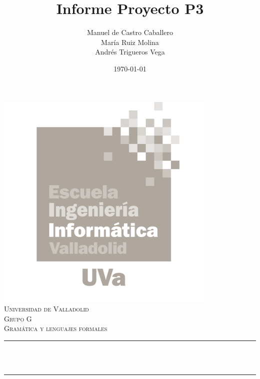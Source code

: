 \documentclass[12pt]{article}
\title{Informe Proyecto P3}					%
\author{Manuel de Castro Caballero \\ María Ruiz Molina \\ Andrés Trigueros Vega}				%
\date{\today}						%
\makeatletter
\let\thetitle\@title
\let\theauthor\@author
\let\thedate\@date
\makeatother
\begin{document}

\begin{titlepage}
	\centering
    \vspace*{0.0 cm}
    \includegraphics[scale = 0.5]{Logo.png}\\[1.0 cm]	%
    \textsc{\LARGE Universidad de Valladolid}\\[2.0 cm]	%
	\textsc{\Large Grupo G}\\[0.5 cm]				%
	\textsc{\large Gramática y lenguajes formales}\\[0.5 cm]		%
	\rule{\linewidth}{0.2 mm} \\[0.4 cm]
	{ \huge \bfseries \thetitle}\\
	\rule{\linewidth}{0.2 mm} \\[1.5 cm]
	
	\begin{minipage}{0.6\textwidth}
		\begin{center} \large
			\theauthor\linebreak
			\end{center}
	\end{minipage}\\[1 cm]
	
	{\large \thedate}\\[2 cm]
 
	\vfill
	
\end{titlepage}
\end{document}
